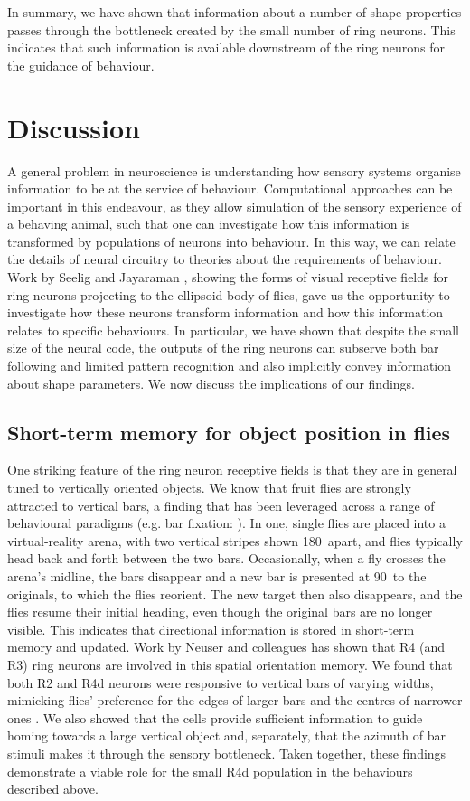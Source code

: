 In summary, we have shown that information about a number of shape properties passes through the bottleneck created by the small number of ring neurons. This indicates that such information is available downstream of the ring neurons for the guidance of behaviour.

\section*{Discussion}
A general problem in neuroscience is understanding how sensory systems organise information to be at the service of behaviour. Computational approaches can be important in this endeavour, as they allow simulation of the sensory experience of a behaving animal, such that one can investigate how this information is transformed by populations of neurons into behaviour. In this way, we can relate the details of neural circuitry to theories about the requirements of behaviour. Work by Seelig and Jayaraman \cite{Seelig2013}, showing the forms of visual receptive fields for ring neurons projecting to the ellipsoid body of flies, gave us the opportunity to investigate how these neurons transform information and how this information relates to specific behaviours. In particular, we have shown that despite the small size of the neural code, the outputs of the ring neurons can subserve both bar following and limited pattern recognition and also implicitly convey information about shape parameters. We now discuss the implications of our findings.

\subsection*{Short-term memory for object position in flies}
One striking feature of the ring neuron receptive fields is that they are in general tuned to vertically oriented objects. We know that fruit flies are strongly attracted to vertical bars, a finding that has been leveraged across a range of behavioural paradigms (e.g. bar fixation: \cite{Neuser2008}). In one, single flies are placed into a virtual-reality arena, with two vertical stripes shown 180\degree\ apart, and flies typically head back and forth between the two bars. Occasionally, when a fly crosses the arena’s midline, the bars disappear and a new bar is presented at 90\degree\ to the originals, to which the flies reorient. The new target then also disappears, and the flies resume their initial heading, even though the original bars are no longer visible. This indicates that directional information is stored in short-term memory and updated. Work by Neuser and colleagues \cite{Neuser2008} has shown that R4 (and R3) ring neurons are involved in this spatial orientation memory. We found that both R2 and R4d neurons were responsive to vertical bars of varying widths, mimicking flies' preference for the edges of larger bars and the centres of narrower ones \cite{Osorio1990}. We also showed that the cells provide sufficient information to guide homing towards a large vertical object and, separately, that the azimuth of bar stimuli makes it through the sensory bottleneck. Taken together, these findings demonstrate a viable role for the small R4d population in the behaviours described above.


